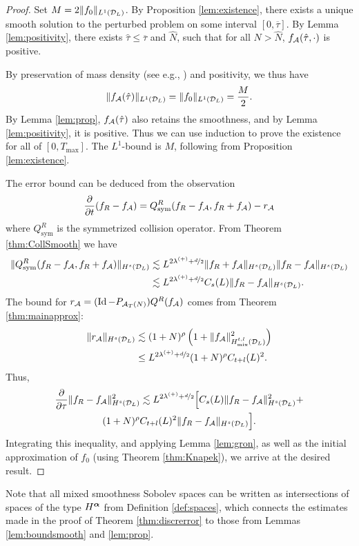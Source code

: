 \begin{proof}
    Set $M=2\|f_0\|_{L^1(\mathcal{D}_L)}$. By Proposition \ref{lem:existence}, there
    exists a unique smooth solution to the perturbed problem on some interval
    $[0,\overline{\tau}]$. By Lemma \ref{lem:positivity}, there exists
    $\hat{\tau}\leq\overline{\tau}$ and $\hat{N}$, such that for all
    $N>\hat{N}$, $f_{\mathcal{A}}(\hat{\tau},\cdot)$ is positive.

      By preservation of mass density
      (see e.g., \cite[Equation (3.4)]{Filbet11}) and positivity, we thus have
    $$
        \|f_{\mathcal{A}}(\hat{\tau})\|_{L^1(\mathcal{D}_L)} = \|f_0\|_{L^1(\mathcal{D}_L)} =
        \frac{M}{2}.
    $$
    By Lemma \ref{lem:prop}, $f_{\mathcal{A}}(\hat{\tau})$ also retains the smoothness,
    and by Lemma \ref{lem:positivity}, it is positive. Thus we can use
    induction to prove the existence for all of $[0,T_\mathrm{max}]$. The
    $L^1$-bound is $M$, following from Proposition \ref{lem:existence}.

    The error bound can be deduced from the observation
    $$
        \frac{\partial}{\partial t}(f_R-f_{\mathcal{A}}) = 
        Q^R_{\mathrm{sym}}(f_R-f_{\mathcal{A}},f_R+f_{\mathcal{A}}) - r_{\mathcal{A}}
    $$
    where $Q^R_{\mathrm{sym}}$ is the symmetrized collision operator. From
    Theorem \ref{thm:CollSmooth} we have
    \begin{align*}
        \|Q^R_{\mathrm{sym}}(f_R-f_{\mathcal{A}},f_R+f_{\mathcal{A}})\|_{H^s(\mathcal{D}_L)} & \lesssim
        L^{2\lambda^{(+)}+\nicefrac{d}{2}}\|f_R+f_{\mathcal{A}}\|_{H^s(\mathcal{D}_L)}\|f_R-f_{\mathcal{A}}\|_{H^s(\mathcal{D}_L)} \\ 
        & \lesssim L^{2\lambda^{(+)}+\nicefrac{d}{2}}C_s(L)\|f_R-f_{\mathcal{A}}\|_{H^s(\mathcal{D}_L)}.
    \end{align*}
    The bound for $r_{\mathcal{A}}=(\operatorname{Id}-P_{\mathcal{A}_T(N)})Q^R(f_{\mathcal{A}})$ comes from Theorem
    \ref{thm:mainapprox}:
    \begin{align*}
        \|r_{\mathcal{A}}\|_{H^s(\mathcal{D}_L)} & \lesssim (1+N)^{\rho}
        \left(1+\|f_{\mathcal{A}}\|_{{H}^{t,l}_\mathrm{mix}(\mathcal{D}_L)}^2\right)
        \\ &\leq L^{2\lambda^{(+)}+\nicefrac{d}{2}}(1+N)^{\rho}C_{t+l}(L)^2.
    \end{align*}
    Thus,
    \begin{multline*}
        \frac{\partial}{\partial\tau} \|f_R-f_{\mathcal{A}}\|^2_{H^s(\mathcal{D}_L)} \lesssim
        L^{2\lambda^{(+)}+\nicefrac{d}{2}} \Big[ C_s(L)\|f_R-f_{\mathcal{A}}\|^2_{H^s(\mathcal{D}_L)} + \\
        (1+N)^{\rho}C_{t+l}(L)^2\|f_R-f_{\mathcal{A}}\|_{H^s(\mathcal{D}_L)} \Big] .
    \end{multline*}
    Integrating this inequality, and applying Lemma \ref{lem:gron}, as well as
    the initial approximation of $f_0$ (using Theorem \ref{thm:Knapek}), we
    arrive at the desired result.
\end{proof}
Note that all mixed smoothness Sobolev spaces can be written as intersections of spaces of the type
$H^{{\bm\alpha}}$ from Definition \ref{def:spaces}, which connects the estimates made in the proof of Theorem
\ref{thm:discrerror} to those from Lemmas \ref{lem:boundsmooth} and \ref{lem:prop}.


